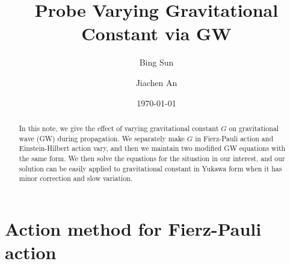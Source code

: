 \documentclass[
    jor,
    amsmath,amssymb,preprint,
    superscriptaddress,
]{revtex4-2}
\begin{document}

\title[Probe Varying Gravitational Constant via GW]{Probe Varying Gravitational Constant via GW}%

\author{Bing Sun}
\author{Jiachen An}

\date{\today}%

\begin{abstract}
In this note, we give the effect of varying gravitational constant $G$ on  gravitational wave (GW) during propagation. We separately make $G$ in Fierz-Pauli action and Einstein-Hilbert action vary, and then we maintain two modified GW equations with the same form. We then solve the equations for the situation in our interest, and our solution can be easily applied to gravitational constant in Yukawa form when it has minor correction and slow variation.
\end{abstract}


\maketitle

\section{Action method for Fierz-Pauli action}
\end{document}
